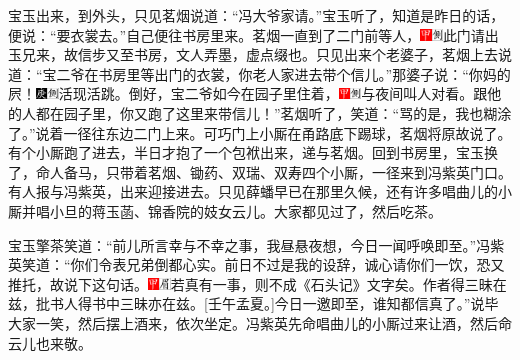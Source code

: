 宝玉出来，到外头，只见茗烟说道：“冯大爷家请。”宝玉听了，知道是昨日的话，便说：“要衣裳去。”自己便往书房里来。茗烟一直到了二门前等人，{\includegraphics[width=3mm]{../Images/00002}\includegraphics[width=3mm]{../Images/00011}\footnotesize \kaishu 此门请出玉兄来，故信步又至书房，文人弄墨，虚点缀也。}只见出来个老婆子，茗烟上去说道：“宝二爷在书房里等出门的衣裳，你老人家进去带个信儿。”那婆子说：“你妈的屄！{\includegraphics[width=3mm]{../Images/00004}\includegraphics[width=3mm]{../Images/00011}\footnotesize \kaishu 活现活跳。}倒好，宝二爷如今在园子里住着，{\includegraphics[width=3mm]{../Images/00002}\includegraphics[width=3mm]{../Images/00011}\footnotesize \kaishu 与夜间叫人对看。}跟他的人都在园子里，你又跑了这里来带信儿！”茗烟听了，笑道：“骂的是，我也糊涂了。”说着一径往东边二门上来。可巧门上小厮在甬路底下踢球，茗烟将原故说了。有个小厮跑了进去，半日才抱了一个包袱出来，递与茗烟。回到书房里，宝玉换了，命人备马，只带着茗烟、锄药、双瑞、双寿四个小厮，一径来到冯紫英门口。有人报与冯紫英，出来迎接进去。只见薛蟠早已在那里久候，还有许多唱曲儿的小厮并唱小旦的蒋玉菡、锦香院的妓女云儿。大家都见过了，然后吃茶。

宝玉擎茶笑道：“前儿所言幸与不幸之事，我昼悬夜想，今日一闻呼唤即至。”冯紫英笑道：“你们令表兄弟倒都心实。前日不过是我的设辞，诚心请你们一饮，恐又推托，故说下这句话。{\includegraphics[width=3mm]{../Images/00002}\includegraphics[width=3mm]{../Images/00010}\footnotesize \kaishu 若真有一事，则不成《石头记》文字矣。作者得三昧在兹，批书人得书中三昧亦在兹。{[}壬午孟夏。{]}}今日一邀即至，谁知都信真了。”说毕大家一笑，然后摆上酒来，依次坐定。冯紫英先命唱曲儿的小厮过来让酒，然后命云儿也来敬。

